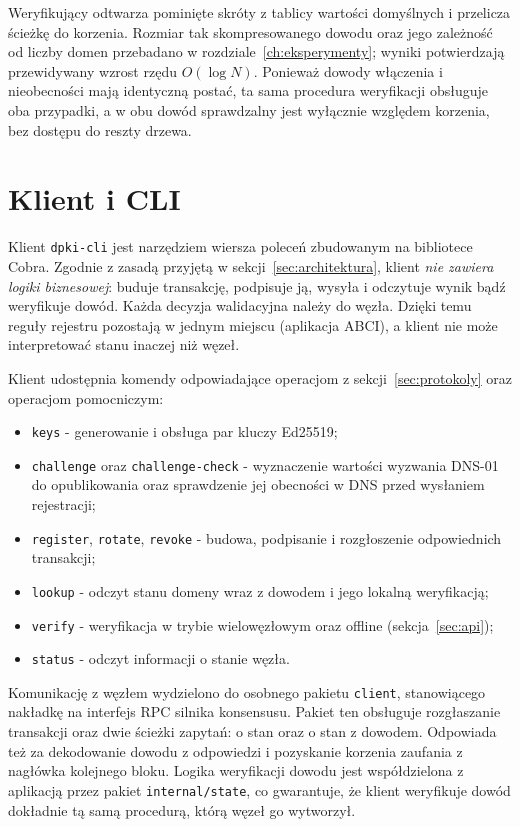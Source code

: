 Weryfikujący odtwarza pominięte skróty z tablicy wartości domyślnych i przelicza ścieżkę do korzenia. Rozmiar tak skompresowanego dowodu oraz jego zależność od liczby domen przebadano w rozdziale~\ref{ch:eksperymenty}; wyniki potwierdzają przewidywany wzrost rzędu $O(\log N)$. Ponieważ dowody włączenia i nieobecności mają identyczną postać, ta sama procedura weryfikacji obsługuje oba przypadki, a w obu dowód sprawdzalny jest wyłącznie względem korzenia, bez dostępu do reszty drzewa.

\section{Klient i CLI}
\label{sec:klient-cli}

Klient \texttt{dpki-cli} jest narzędziem wiersza poleceń zbudowanym na bibliotece Cobra. Zgodnie z zasadą przyjętą w sekcji~\ref{sec:architektura}, klient \emph{nie zawiera logiki biznesowej}: buduje transakcję, podpisuje ją, wysyła i odczytuje wynik bądź weryfikuje dowód. Każda decyzja walidacyjna należy do węzła. Dzięki temu reguły rejestru pozostają w jednym miejscu (aplikacja ABCI), a klient nie może interpretować stanu inaczej niż węzeł.

Klient udostępnia komendy odpowiadające operacjom z sekcji~\ref{sec:protokoly} oraz operacjom pomocniczym:
\begin{itemize}
    \item \texttt{keys} - generowanie i obsługa par kluczy Ed25519;
    \item \texttt{challenge} oraz \texttt{challenge-check} - wyznaczenie wartości wyzwania DNS-01 do opublikowania oraz sprawdzenie jej obecności w DNS przed wysłaniem rejestracji;
    \item \texttt{register}, \texttt{rotate}, \texttt{revoke} - budowa, podpisanie i rozgłoszenie odpowiednich transakcji;
    \item \texttt{lookup} - odczyt stanu domeny wraz z dowodem i jego lokalną weryfikacją;
    \item \texttt{verify} - weryfikacja w trybie wielowęzłowym oraz offline (sekcja~\ref{sec:api});
    \item \texttt{status} - odczyt informacji o stanie węzła.
\end{itemize}

Komunikację z węzłem wydzielono do osobnego pakietu \texttt{client}, stanowiącego nakładkę na interfejs RPC silnika konsensusu. Pakiet ten obsługuje rozgłaszanie transakcji oraz dwie ścieżki zapytań: o stan oraz o stan z dowodem. Odpowiada też za dekodowanie dowodu z odpowiedzi i pozyskanie korzenia zaufania z nagłówka kolejnego bloku. Logika weryfikacji dowodu jest współdzielona z aplikacją przez pakiet \texttt{internal/state}, co gwarantuje, że klient weryfikuje dowód dokładnie tą samą procedurą, którą węzeł go wytworzył.

